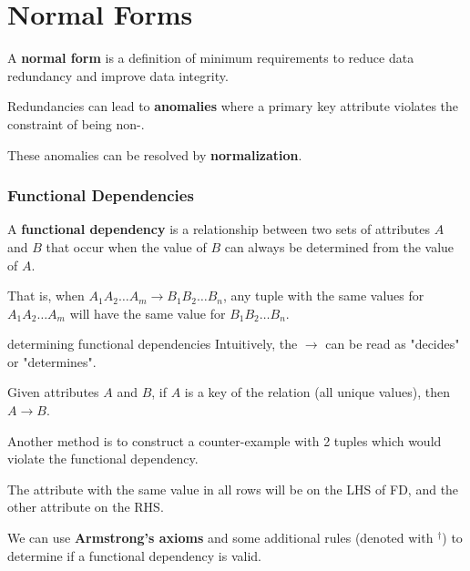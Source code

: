 \part{Normal Forms}
A \textbf{normal form} is a definition of minimum requirements to reduce data redundancy and improve data integrity.

Redundancies can lead to \textbf{anomalies} where a primary key attribute violates the constraint of being non-.

These anomalies can be resolved by \textbf{normalization}.


\section{Functional Dependencies}
A \textbf{functional dependency} is a relationship between two sets of attributes $A$ and $B$ that occur when the value of $B$ can always be determined from the value of $A$.

That is, when $A_1 A_2 \dots A_m \rightarrow B_1 B_2 \dots B_n$, any tuple with the same values for $A_1 A_2 \dots A_m$ will have the same value for $B_1 B_2 \dots B_n$.

\begin{defn}{determining functional dependencies}
    Intuitively, the $\rightarrow$ can be read as "decides" or "determines".

    Given attributes $A$ and $B$, if $A$ is a key of the relation (all unique values), then $A \rightarrow B$.
    
    Another method is to construct a counter-example with 2 tuples which would violate the functional dependency.
    
    The attribute with the same value in all rows will be on the LHS of FD, and the other attribute on the RHS. 
\end{defn}

We can use \textbf{Armstrong's axioms} and some additional rules (denoted with $^\dagger$) to determine if a functional dependency is valid.

\begin{itemize}
\end{itemize}

